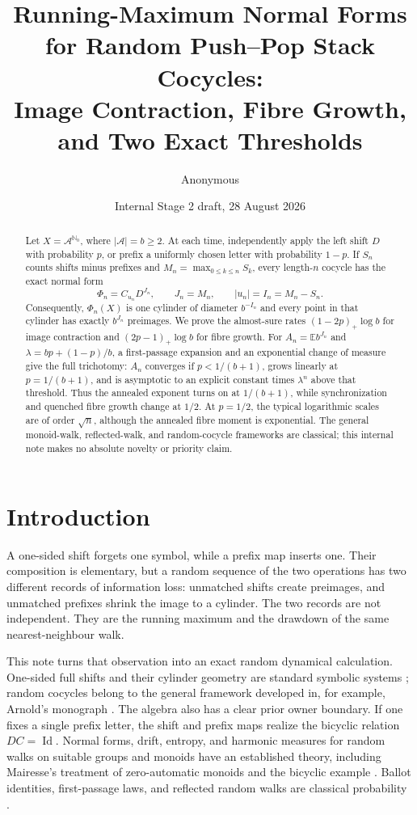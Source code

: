 \documentclass[11pt,a4paper]{amsart}
\title[Random push--pop stack cocycles]{Running-Maximum Normal Forms for Random Push--Pop Stack Cocycles:\\
Image Contraction, Fibre Growth, and Two Exact Thresholds}
\author{Anonymous}
\date{Internal Stage 2 draft, 28 August 2026}
\theoremstyle{definition}
\theoremstyle{remark}
\newcommand{\A}{\mathcal A}
\newcommand{\N}{\mathbb N}
\newcommand{\Exp}{\mathbb E}
\newcommand{\Id}{\operatorname{Id}}
\begin{document}
\begin{abstract}
Let $X=\A^{\N_0}$, where $|\A|=b\geq2$.  At each time, independently
apply the left shift $D$ with probability $p$, or prefix a uniformly chosen
letter with probability $1-p$.  If $S_n$ counts shifts minus prefixes and
$M_n=\max_{0\leq k\leq n}S_k$, every length-$n$ cocycle has the exact
normal form
\[
 \Phi_n=C_{u_n}D^{J_n},\qquad J_n=M_n,\qquad |u_n|=I_n=M_n-S_n.
\]
Consequently, $\Phi_n(X)$ is one cylinder of diameter $b^{-I_n}$ and every
point in that cylinder has exactly $b^{J_n}$ preimages.  We prove the
almost-sure rates $(1-2p)_+\log b$ for image contraction and
$(2p-1)_+\log b$ for fibre growth.  For
$A_n=\Exp b^{J_n}$ and $\lambda=bp+(1-p)/b$, a first-passage expansion and
an exponential change of measure give the full trichotomy: $A_n$ converges
if $p<1/(b+1)$, grows linearly at $p=1/(b+1)$, and is asymptotic to an
explicit constant times $\lambda^n$ above that threshold.  Thus the
annealed exponent turns on at $1/(b+1)$, while synchronization and quenched
fibre growth change at $1/2$.  At $p=1/2$, the typical logarithmic scales
are of order $\sqrt n$, although the annealed fibre moment is exponential.
The general monoid-walk, reflected-walk, and random-cocycle frameworks are
classical; this internal note makes no absolute novelty or priority claim.
\end{abstract}

\maketitle

\section{Introduction}

A one-sided shift forgets one symbol, while a prefix map inserts one.  Their
composition is elementary, but a random sequence of the two operations has
two different records of information loss: unmatched shifts create
preimages, and unmatched prefixes shrink the image to a cylinder.  The two
records are not independent.  They are the running maximum and the
drawdown of the same nearest-neighbour walk.

This note turns that observation into an exact random dynamical calculation.
One-sided full shifts and their cylinder geometry are standard symbolic
systems \cite{LindMarcus1995}; random cocycles belong to the general
framework developed in, for example, Arnold's monograph
\cite{Arnold1998}.  The algebra also has a clear prior owner boundary.  If
one fixes a single prefix letter, the shift and prefix maps realize the
bicyclic relation $DC=\Id$.  Normal forms, drift, entropy, and harmonic
measures for random walks on suitable groups and monoids have an established
theory, including Mairesse's treatment of zero-automatic monoids and the
bicyclic example \cite{Mairesse2005}.  Ballot identities, first-passage
laws, and reflected random walks are classical probability
\cite{Feller1968,Asmussen2003}.
\end{document}
